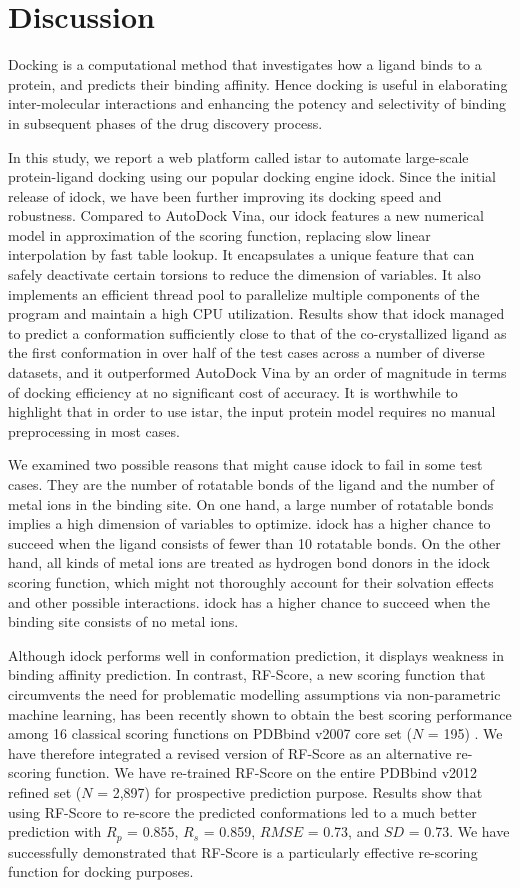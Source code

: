 \section{Discussion}

Docking is a computational method that investigates how a ligand binds to a protein, and predicts their binding affinity. Hence docking is useful in elaborating inter-molecular interactions and enhancing the potency and selectivity of binding in subsequent phases of the drug discovery process.

In this study, we report a web platform called istar to automate large-scale protein-ligand docking using our popular docking engine idock. Since the initial release of idock, we have been further improving its docking speed and robustness. Compared to AutoDock Vina, our idock features a new numerical model in approximation of the scoring function, replacing slow linear interpolation by fast table lookup. It encapsulates a unique feature that can safely deactivate certain torsions to reduce the dimension of variables. It also implements an efficient thread pool to parallelize multiple components of the program and maintain a high CPU utilization. Results show that idock managed to predict a conformation sufficiently close to that of the co-crystallized ligand as the first conformation in over half of the test cases across a number of diverse datasets, and it outperformed AutoDock Vina by an order of magnitude in terms of docking efficiency at no significant cost of accuracy. It is worthwhile to highlight that in order to use istar, the input protein model requires no manual preprocessing in most cases.

We examined two possible reasons that might cause idock to fail in some test cases. They are the number of rotatable bonds of the ligand and the number of metal ions in the binding site. On one hand, a large number of rotatable bonds implies a high dimension of variables to optimize. idock has a higher chance to succeed when the ligand consists of fewer than 10 rotatable bonds. On the other hand, all kinds of metal ions are treated as hydrogen bond donors in the idock scoring function, which might not thoroughly account for their solvation effects and other possible interactions. idock has a higher chance to succeed when the binding site consists of no metal ions.

Although idock performs well in conformation prediction, it displays weakness in binding affinity prediction. In contrast, RF-Score, a new scoring function that circumvents the need for problematic modelling assumptions via non-parametric machine learning, has been recently shown to obtain the best scoring performance among 16 classical scoring functions on PDBbind v2007 core set ($N$ = 195) \citep{564}. We have therefore integrated a revised version of RF-Score as an alternative re-scoring function. We have re-trained RF-Score on the entire PDBbind v2012 refined set ($N$ = 2,897) for prospective prediction purpose. Results show that using RF-Score to re-score the predicted conformations led to a much better prediction with $R_p$ = 0.855, $R_s$ = 0.859, $RMSE$ = 0.73, and $SD$ = 0.73. We have successfully demonstrated that RF-Score is a particularly effective re-scoring function for docking purposes.

